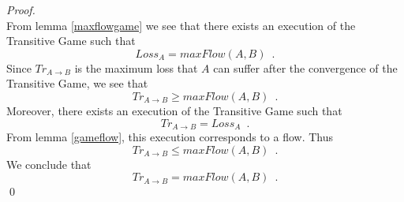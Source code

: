 \documentclass[11pt]{llncs}
\begin{document}
    \begin{proof} \ \\
       From lemma \ref{maxflowgame} we see that there exists an execution of the Transitive Game such that
       \begin{equation}
          Loss_A = maxFlow\left(A, B\right) \enspace.
       \end{equation}
       Since $Tr_{A \rightarrow B}$ is the maximum loss that $A$ can suffer after the convergence of the Transitive Game, we
       see that
       \begin{equation}
          Tr_{A \rightarrow B} \geq maxFlow\left(A, B\right) \enspace.
       \end{equation}
       Moreover, there exists an execution of the Transitive Game such that
       \begin{equation}
          Tr_{A \rightarrow B} = Loss_A \enspace.
       \end{equation}
       From lemma \ref{gameflow}, this execution corresponds to a flow. Thus
       \begin{equation}
          Tr_{A \rightarrow B} \leq maxFlow\left(A, B\right) \enspace.
       \end{equation}
       We conclude that
       \begin{equation}
          Tr_{A \rightarrow B} = maxFlow\left(A, B\right) \enspace.
       \end{equation}
       \qed
    \end{proof}
\end{document}

